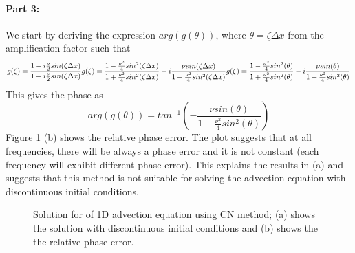 \paragraph{Part 3:}
We start by deriving the expression $arg(g(\theta))$, where $\theta = \zeta \Delta x$ from the amplification factor such that
$$
g(\zeta) = \frac{1-i\frac{\nu}{2}sin(\zeta \Delta x)}{1+i\frac{\nu}{2}sin(\zeta \Delta x)}\\
g(\zeta) = \frac{1-\frac{\nu^{2}}{4}sin^{2}(\zeta \Delta x)}{1+\frac{\nu^{2}}{4}sin^{2}(\zeta \Delta x)} - i\frac{\nu sin(\zeta \Delta x)}{1+\frac{\nu^{2}}{4}sin^{2}(\zeta \Delta x)}\\
g(\zeta) = \frac{1-\frac{\nu^{2}}{4}sin^{2}(\theta)}{1+\frac{\nu^{2}}{4}sin^{2}(\theta)} - i\frac{\nu sin(\theta)}{1+\frac{\nu^{2}}{4}sin^{2}(\theta)}
$$
This gives the phase as
$$
arg(g(\theta)) = tan^{-1}(-\frac{\nu sin(\theta)}{1-\frac{\nu^{2}}{4}sin^{2}(\theta)})
$$
Figure \ref{fig:cn} (b) shows the relative phase error. The plot suggests that at all frequencies, there will be always a phase error and it is not constant (each frequency will exhibit different phase error). This explains the results in (a) and suggests that this method is not suitable for solving the advection equation with discontinuous initial conditions. 

\begin{figure}[!tbh]
 \centering        
 
     \caption{Solution for of 1D advection equation using CN method; (a) shows the solution with discontinuous initial conditions and (b) shows the the relative phase error.}
   \label{fig:cn}
\end{figure} 